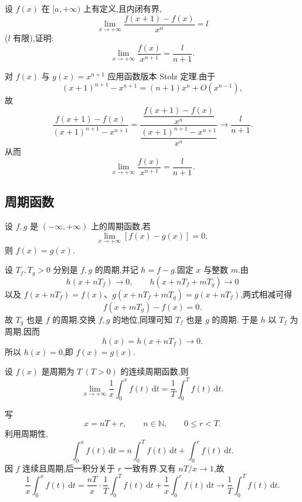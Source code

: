 \begin{example}
    设 $f(x)$ 在 $\lbrack a,+\infty)$ 上有定义,且内闭有界,
    \[
        \lim\limits_{x\to+\infty}
        \dfrac{f(x+1)-f(x)}{x^n}=l
    \]
    ($l$ 有限),证明:
    \[
        \lim\limits_{x\to+\infty}\dfrac{f(x)}{x^{n+1}}
        =\dfrac{l}{n+1}.
    \]
\end{example}
\exampleblank

\begin{solution}
    对 $f(x)$ 与 $g(x)=x^{n+1}$ 应用函数版本 Stolz 定理.由于
    \[
        (x+1)^{n+1}-x^{n+1}
        =(n+1)x^n+O(x^{n-1}),
    \]
    故
    \[
        \dfrac{f(x+1)-f(x)}{(x+1)^{n+1}-x^{n+1}}
        =\dfrac{\dfrac{f(x+1)-f(x)}{x^n}}
        {\dfrac{(x+1)^{n+1}-x^{n+1}}{x^n}}
        \longrightarrow\dfrac{l}{n+1}.
    \]
    从而
    \[
        \lim\limits_{x\to+\infty}\dfrac{f(x)}{x^{n+1}}
        =\dfrac{l}{n+1}.
    \]
\end{solution}



\subsection{周期函数}

\begin{example}
    设 $f,g$ 是 $(-\infty,+\infty)$ 上的周期函数,若
    \[
        \lim\limits_{x\to+\infty}[f(x)-g(x)]=0,
    \]
    则 $f(x)=g(x)$.
\end{example}
\exampleblank

\begin{solution}
    设 $T_f,T_g>0$ 分别是 $f,g$ 的周期,并记 $h=f-g$.固定 $x$ 与整数 $m$.由
    \[
        h(x+nT_f)\to0,
        \qquad
        h(x+nT_f+mT_g)\to0
    \]
    以及 $f(x+nT_f)=f(x)$、$g(x+nT_f+mT_g)=g(x+nT_f)$,两式相减可得
    \[
        f(x+mT_g)-f(x)=0.
    \]
    故 $T_g$ 也是 $f$ 的周期.交换 $f,g$ 的地位,同理可知 $T_f$ 也是 $g$ 的周期.
    于是 $h$ 以 $T_f$ 为周期,因而
    \[
        h(x)=h(x+nT_f)\longrightarrow0.
    \]
    所以 $h(x)=0$,即 $f(x)=g(x)$.
\end{solution}

\begin{example}
    设 $f(x)$ 是周期为 $T\ (T>0)$ 的连续周期函数,则
    \[
        \lim\limits_{x\to+\infty}
        \dfrac{1}{x}\int_0^x f(t)\,\mathrm{d}t
        =\dfrac{1}{T}\int_0^T f(t)\,\mathrm{d}t.
    \]
\end{example}
\exampleblank

\begin{solution}
    写
    \[
        x=nT+r,
        \qquad
        n\in\mathbb{N},
        \qquad
        0\leq r<T.
    \]
    利用周期性,
    \[
        \int_0^x f(t)\,\mathrm{d}t
        =n\int_0^T f(t)\,\mathrm{d}t+\int_0^r f(t)\,\mathrm{d}t.
    \]
    因 $f$ 连续且周期,后一积分关于 $r$ 一致有界.又有 $nT/x\to1$,故
    \[
        \dfrac{1}{x}\int_0^x f(t)\,\mathrm{d}t
        =\dfrac{nT}{x}\cdot\dfrac{1}{T}\int_0^T f(t)\,\mathrm{d}t
        +\dfrac{1}{x}\int_0^r f(t)\,\mathrm{d}t
        \longrightarrow\dfrac{1}{T}\int_0^T f(t)\,\mathrm{d}t.
    \]
\end{solution}


